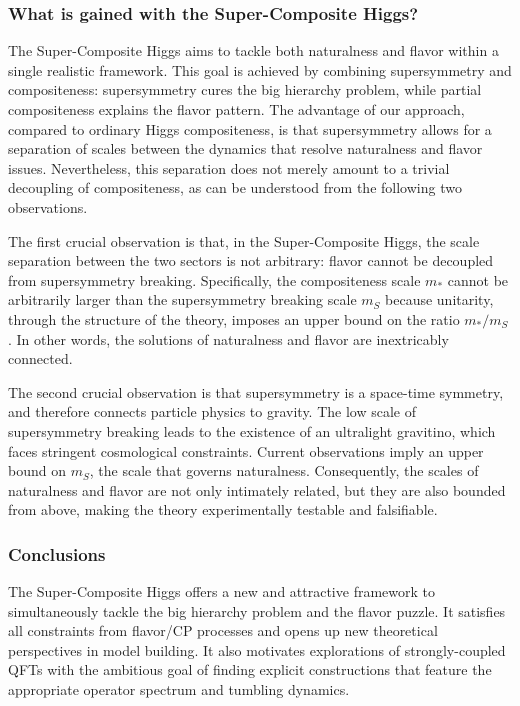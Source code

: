 \documentclass[a4paper,12pt]{article}
\def\mst{m_*}
\def\mS{m_S}
\begin{document}
{{{{\subsubsection*{What is gained with the Super-Composite Higgs?}

The Super-Composite Higgs aims to tackle both naturalness and flavor within a single realistic framework. This goal is achieved by combining supersymmetry and compositeness: supersymmetry cures the big hierarchy problem, while partial compositeness explains the flavor pattern. The advantage of our approach, compared to ordinary Higgs compositeness, is that supersymmetry allows for a separation of scales between the dynamics that resolve naturalness and flavor issues. Nevertheless, this separation does not merely amount to a trivial decoupling of compositeness, as can be understood from the following two observations.

The first crucial observation is that, in the Super-Composite Higgs, the scale separation between the two sectors is not arbitrary: flavor cannot be decoupled from supersymmetry breaking. Specifically,
the compositeness scale $\mst$ cannot be arbitrarily larger than the supersymmetry breaking scale $\mS$ because unitarity, through the structure of the theory, imposes an upper bound on the ratio $\mst /\mS$. In other words, the solutions of naturalness and flavor are inextricably connected.

The second crucial observation is that supersymmetry is a space-time symmetry, and therefore connects particle physics to gravity. The low scale of supersymmetry breaking leads to the existence of an ultralight gravitino, which faces stringent cosmological constraints. Current observations imply an upper bound on $\mS$, the scale that governs naturalness. Consequently,  the scales of naturalness and flavor are not only intimately related, but they are also bounded from above, making the theory experimentally testable and falsifiable.

\subsubsection*{Conclusions}

The Super-Composite Higgs offers a new and attractive framework to simultaneously tackle the big hierarchy problem and the flavor puzzle. It satisfies all constraints from flavor/CP processes and opens up new theoretical perspectives in model building. It also motivates explorations of strongly-coupled QFTs with the ambitious goal of finding explicit constructions that feature the appropriate operator spectrum and tumbling dynamics.

}}}}
\end{document}
